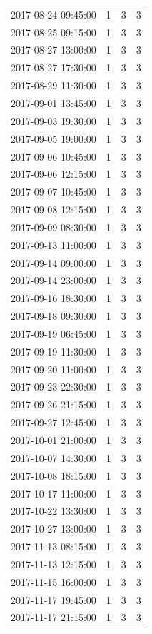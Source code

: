 \begin{tabular}{lrrr}
2017-08-24 09:45:00 & 1 & 3 & 3 \\
2017-08-25 09:15:00 & 1 & 3 & 3 \\
2017-08-27 13:00:00 & 1 & 3 & 3 \\
2017-08-27 17:30:00 & 1 & 3 & 3 \\
2017-08-29 11:30:00 & 1 & 3 & 3 \\
2017-09-01 13:45:00 & 1 & 3 & 3 \\
2017-09-03 19:30:00 & 1 & 3 & 3 \\
2017-09-05 19:00:00 & 1 & 3 & 3 \\
2017-09-06 10:45:00 & 1 & 3 & 3 \\
2017-09-06 12:15:00 & 1 & 3 & 3 \\
2017-09-07 10:45:00 & 1 & 3 & 3 \\
2017-09-08 12:15:00 & 1 & 3 & 3 \\
2017-09-09 08:30:00 & 1 & 3 & 3 \\
2017-09-13 11:00:00 & 1 & 3 & 3 \\
2017-09-14 09:00:00 & 1 & 3 & 3 \\
2017-09-14 23:00:00 & 1 & 3 & 3 \\
2017-09-16 18:30:00 & 1 & 3 & 3 \\
2017-09-18 09:30:00 & 1 & 3 & 3 \\
2017-09-19 06:45:00 & 1 & 3 & 3 \\
2017-09-19 11:30:00 & 1 & 3 & 3 \\
2017-09-20 11:00:00 & 1 & 3 & 3 \\
2017-09-23 22:30:00 & 1 & 3 & 3 \\
2017-09-26 21:15:00 & 1 & 3 & 3 \\
2017-09-27 12:45:00 & 1 & 3 & 3 \\
2017-10-01 21:00:00 & 1 & 3 & 3 \\
2017-10-07 14:30:00 & 1 & 3 & 3 \\
2017-10-08 18:15:00 & 1 & 3 & 3 \\
2017-10-17 11:00:00 & 1 & 3 & 3 \\
2017-10-22 13:30:00 & 1 & 3 & 3 \\
2017-10-27 13:00:00 & 1 & 3 & 3 \\
2017-11-13 08:15:00 & 1 & 3 & 3 \\
2017-11-13 12:15:00 & 1 & 3 & 3 \\
2017-11-15 16:00:00 & 1 & 3 & 3 \\
2017-11-17 19:45:00 & 1 & 3 & 3 \\
2017-11-17 21:15:00 & 1 & 3 & 3 \\

\end{tabular}

